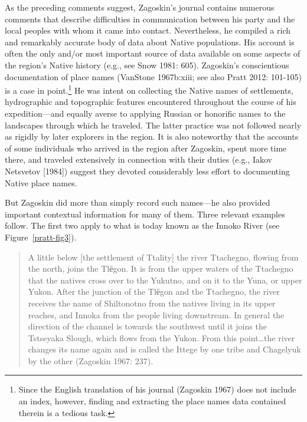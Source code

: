 As the preceding comments suggest, Zagoskin’s journal contains numerous comments that describe difficulties in communication between his party and the local peoples with whom it came into contact. Nevertheless, he compiled a rich and remarkably accurate body of data about Native populations. His account is often the only and/or most important source of data available on some aspects of the region’s Native history (e.g., see Snow 1981: 605). Zagoskin’s conscientious documentation of place names (VanStone 1967b:xiii; see also Pratt 2012: 101-105) is a case in point.\footnote{Since the English translation of his journal (Zagoskin 1967) does not include an index, however, finding and extracting the place names data contained therein is a tedious task.} He was intent on collecting the Native names of settlements, hydrographic and topographic features encountered throughout the course of his expedition—and equally averse to applying Russian or honorific names to the landscapes through which he traveled. The latter practice was not followed nearly as rigidly by later explorers in the region. It is also noteworthy that the accounts of some individuals who arrived in the region after Zagoskin, spent more time there, and traveled extensively in connection with their duties (e.g., Iakov Netsvetov [1984]) suggest they devoted considerably less effort to documenting Native place names.

But Zagoskin did more than simply record such names—he also provided important contextual information for many of them. Three relevant examples follow. The first two apply to what is today known as the Innoko River (see Figure~\ref{pratt-fig3}).

\begin{quote}
    A little below [the settlement of Ttality] the river Ttachegno, flowing from the north, joins the Tlёgon. It is from the upper waters of the Ttachegno that the natives cross over to the Yukutno, and on it to the Yuna, or upper Yukon. After the junction of the Tlёgon and the Ttachegno, the river receives the name of Shiltonotno from the natives living in its upper reaches, and Innoka from the people living downstream. In general the direction of the channel is towards the southwest until it joins the Tstseyaka Slough, which flows from the Yukon. From this point…the river changes its name again and is called the Ittege by one tribe and Chagelyuk by the other (Zagoskin 1967: 237).
\end{quote}



